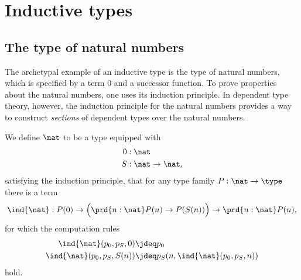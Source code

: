 \chapter{Inductive types}

\section{The type of natural numbers}
The archetypal example of an inductive type is the type of natural numbers, which is specified by a term $0$ and a successor function. To prove properties about the natural numbers, one uses its induction principle. In dependent type theory, however, the induction principle for the natural numbers provides a way to construct \emph{sections} of dependent types over the natural numbers. 

\begin{defn}
We define $\nat$ to be a type equipped with
\begin{align*}
0 & : \nat \\
S & : \nat \to\nat,
\end{align*}
satisfying the induction principle, that for any type family $P:\nat\to\type$ there is a term
\begin{equation*}
\ind{\nat}:P(0)\to \Big(\prd{n:\nat}P(n)\to P(S(n))\Big)\to \prd{n:\nat}P(n),
\end{equation*}
for which the computation rules
\begin{align*}
\ind{\nat}(p_0,p_S,0) & \jdeq p_0 \\
\ind{\nat}(p_0,p_S,S(n)) & \jdeq p_S(n,\ind{\nat}(p_0,p_S,n))
\end{align*}
hold.
\end{defn}

